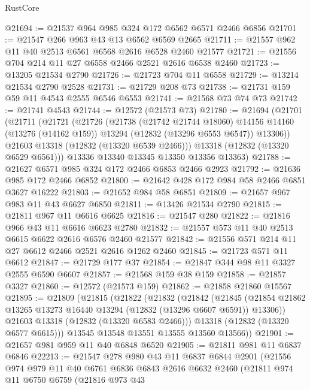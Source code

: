 \begin{lexlean}{RustCore}
\begin{coremodule}
@21694 := @21537 @964 @985 @324 @172 @6562 @6571 @2466 @6856
@21701 := @21547 @266 @963 @43 @13 @6562 @6569 @2665
@21711 := @21557 @962 @11 @40 @2513 @6561 @6568 @2616 @6528 @2460 @21577
@21721 := @21556 @704 @214 @11 @27 @6558 @2466 @2521 @2616 @6538 @2460
@21723 := @13205 @21534 @2790
@21726 := @21723 @704 @11 @6558
@21729 := @13214 @21534 @2790 @2528
@21731 := @21729 @208 @73
@21738 := @21731 @159 @59 @11 @4543 @2555 @6546 @6553
@21741 := @21568 @73 @74 @73
@21742 := @21741 @4543
@21744 := @12572 (@21573 @73)
@21780 := @21694
    (@21701
      (@21711
        (@21721
          (@21726
            (@21738
              (@21742 @21744 @18060)
              @14156
              @14160
              (@13276 (@14162 @159))
              @13294
              (@12832 (@13296 @6553 @6547))
              @13306))
          @21603
          @13318
          (@12832 (@13320 @6539 @2466)))
        @13318
        (@12832 (@13320 @6529 @6561)))
      @13336
      @13340
      @13345
      @13350
      @13356
      @13363)
@21788 := @21627 @6571 @985 @324 @172 @2466 @6853 @2466 @2923
@21792 := @21636 @985 @172 @2466 @6852
@21800 := @21642 @428 @172 @984 @58 @2466 @6851 @3627 @16222
@21803 := @21652 @984 @58 @6851
@21809 := @21657 @967 @983 @11 @43 @6627 @6850
@21811 := @13426 @21534 @2790
@21815 := @21811 @967 @11 @6616 @6625
@21816 := @21547 @280
@21822 := @21816 @966 @43 @11 @6616 @6623 @2780
@21832 := @21557 @573 @11 @40 @2513 @6615 @6622 @2616 @6576 @2460 @21577
@21842 := @21556 @571 @214 @11 @27 @6612 @2466 @2521 @2616 @1262 @2460
@21845 := @21723 @571 @11 @6612
@21847 := @21729 @177 @37
@21854 := @21847 @344 @98 @11 @3327 @2555 @6590 @6607
@21857 := @21568 @159 @38 @159
@21858 := @21857 @3327
@21860 := @12572 (@21573 @159)
@21862 := @21858 @21860 @15567
@21895 := @21809
    (@21815
      (@21822
        (@21832
          (@21842
            (@21845
              (@21854 @21862 @13265 @13273 @16440 @13294 (@12832 (@13296 @6607 @6591)) @13306))
            @21603
            @13318
            (@12832 (@13320 @6583 @2466)))
          @13318
          (@12832 (@13320 @6577 @6615)))
        @13545
        @13548
        @13551
        @13555
        @13560
        @13566))
@21901 := @21657 @981 @959 @11 @40 @6848 @6520
@21905 := @21811 @981 @11 @6837 @6846
@22213 := @21547
    @278
    @980
    @43
    @11
    @6837
    @6844
    @2901
    (@21556
      @974
      @979
      @11
      @40
      @6761
      @6836
      @6843
      @2616
      @6632
      @2460
      (@21811
        @974
        @11
        @6750
        @6759
        (@21816
          @973
          @43

\end{coremodule}
\end{lexlean}
